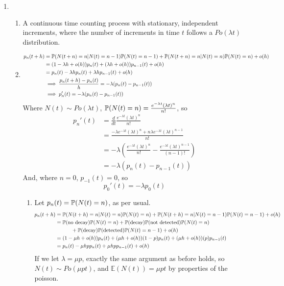 \documentclass{article}
\begin{document}
\begin{enumerate}
\begin{enumerate}
\end{enumerate}
\clearpage
\item
\begin{enumerate}
\item
A continuous time counting process with stationary, independent increments, where the number of increments in time $t$ follows a $Po(\lambda t)$ distribution.
\item
\begin{align*}
p_n(t+h) &= \mathbb{P}(N(t+n)=n | N(t) = n-1)\mathbb{P}(N(t)=n-1) + \mathbb{P}(N(t+n)=n | N(t) = n)\mathbb{P}(N(t)=n) + o(h) \\
&= (1-\lambda h +o(h))p_n(t) + (\lambda h + o(h))p_{n-1}(t) + o(h)\\
&= p_n(t) -\lambda h p_n(t) + \lambda h p_{n-1}(t) + o(h)\\
&\implies \frac{p_n(t+h)-p_n(t)}{h} = -\lambda(p_n(t)-p_{n-1}(t))\\
&\implies p_n'(t) = -\lambda(p_n(t)-p_{n-1}(t))
\end{align*}
Where $N(t) \sim  Po(\lambda t)$, $\mathbb{P}(N(t)=n) = \frac{e^{-\lambda t}(\lambda t)^n}{n!}$, so
\begin{align*}
p_n'(t) &= \frac{d}{dt} \frac{e^{-\lambda t}(\lambda t)^n}{n!}\\
&= \frac{-\lambda e^{-\lambda t}(\lambda t)^n + n \lambda e^{-\lambda t}(\lambda t)^{n-1}}{n!}\\
&= -\lambda \left( \frac{e^{-\lambda t}(\lambda t)^n}{n!} - \frac{e^{-\lambda t}(\lambda t)^{n-1}}{(n-1)!}\right)\\
&= -\lambda(p_n(t) - p_{n-1}(t))
\end{align*}
And, where $n=0$, $p_{-1}(t) = 0$, so 
$$
p_0'(t) = -\lambda p_0(t)
$$
\begin{enumerate}
\item
Let $p_n(t) = \mathbb{P}(N(t) = n)$, as per usual.
\begin{align*}
p_n(t+h) &= \mathbb{P}(N(t+h) = n | N(t) = n)\mathbb{P}(N(t)=n) + \mathbb{P}(N(t+h)=n|N(t)=n-1)\mathbb{P}(N(t)=n-1)+o(h)\\
&=\mathbb{P}(\mbox{no decay})\mathbb{P}(N(t)=n) + \mathbb{P}(\mbox{decay})\mathbb{P}(\mbox{not detected})\mathbb{P}(N(t)=n)
 \\ & \quad \quad \quad + \mathbb{P}(\mbox{decay})\mathbb{P}(\mbox{detected})\mathbb{P}(N(t)=n-1)+o(h)\\
&= (1-\mu h + o(h))p_n(t) + (\mu h + o(h))(1-p)p_n(t) + (\mu h+o(h))(p)p_{n-1}(t)\\
&= p_n(t)-\mu h p p_n(t) + \mu h p p_{n-1}(t) +o(h)
\end{align*}
If we let $\lambda = \mu p$, exactly the same argument as before holds, so $N(t) \sim Po(\mu p t)$, and $\mathbb{E}(N(t)) = \mu p t$ by properties of the poisson.

\end{enumerate}
\end{enumerate}
\end{enumerate}
\end{document}
